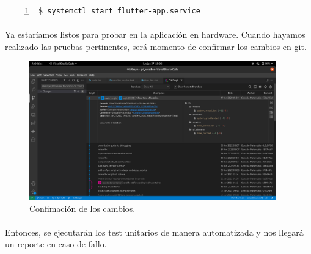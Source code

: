 \begin{lstlisting}[style=consola, numbers=left]
    $ systemctl start flutter-app.service
\end{lstlisting}

\paragraph{}Ya estaríamos listos para probar en la aplicación en hardware. Cuando hayamos
realizado las pruebas pertinentes, será momento de confirmar los cambios en \gls{git}.

\begin{figure}[H]
    \centering
    \includegraphics[width=0.95\textwidth]{imgs/dev2}
    \caption[Confimación de los cambios.]{Confimación de los cambios.}
    \label{imgs:commit}
\end{figure}

\paragraph{}Entonces, se ejecutarán los test unitarios de manera automatizada y nos
llegará un reporte en caso de fallo.

